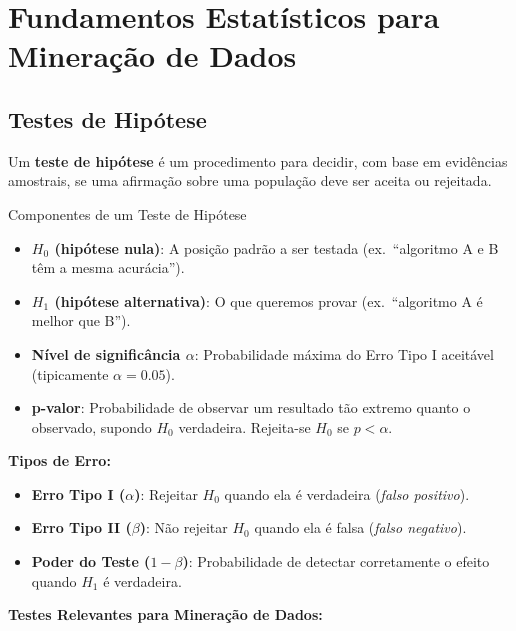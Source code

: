 \documentclass[12pt,a4paper]{article}
\begin{document}
\section{Fundamentos Estatísticos para Mineração de Dados}

\subsection{Testes de Hipótese}

Um \textbf{teste de hipótese} é um procedimento para decidir, com base em evidências amostrais, se uma afirmação sobre uma população deve ser aceita ou rejeitada.

\begin{definicaobox}{Componentes de um Teste de Hipótese}
\begin{itemize}
  \item \textbf{$H_0$ (hipótese nula)}: A posição padrão a ser testada (ex.\ ``algoritmo A e B têm a mesma acurácia'').
  \item \textbf{$H_1$ (hipótese alternativa)}: O que queremos provar (ex.\ ``algoritmo A é melhor que B'').
  \item \textbf{Nível de significância $\alpha$}: Probabilidade máxima do Erro Tipo I aceitável (tipicamente $\alpha = 0.05$).
  \item \textbf{p-valor}: Probabilidade de observar um resultado tão extremo quanto o observado, supondo $H_0$ verdadeira. Rejeita-se $H_0$ se $p < \alpha$.
\end{itemize}
\end{definicaobox}

\textbf{Tipos de Erro:}
\begin{itemize}
  \item \textbf{Erro Tipo I ($\alpha$)}: Rejeitar $H_0$ quando ela é verdadeira (\textit{falso positivo}).
  \item \textbf{Erro Tipo II ($\beta$)}: Não rejeitar $H_0$ quando ela é falsa (\textit{falso negativo}).
  \item \textbf{Poder do Teste ($1-\beta$)}: Probabilidade de detectar corretamente o efeito quando $H_1$ é verdadeira.
\end{itemize}

\textbf{Testes Relevantes para Mineração de Dados:}
\end{document}
